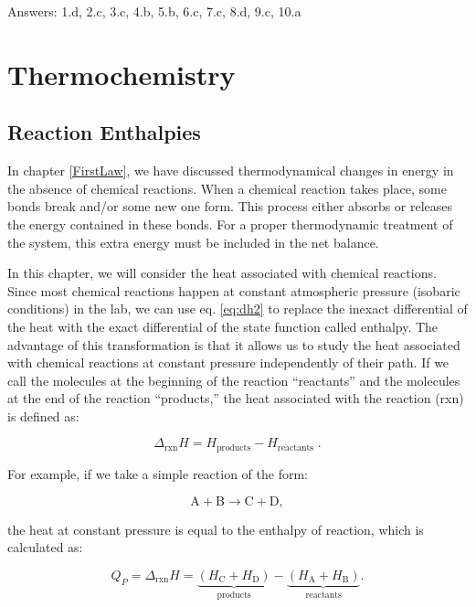 \documentclass[
  9pt,
]{extbook}
\theoremstyle{definition}
\theoremstyle{definition}
\theoremstyle{definition}
\theoremstyle{definition}
\theoremstyle{remark}
\begin{document}
Answers: 1.d, 2.c, 3.c, 4.b, 5.b, 6.c, 7.c, 8.d, 9.c, 10.a

\newcommand*{\standardstate}{{-\kern-6pt{\ominus}\kern-6pt-}}

\chapter{Thermochemistry}\label{Thermochemistry}

\section{Reaction Enthalpies}\label{rxnenthalpy}

In chapter \ref{FirstLaw}, we have discussed thermodynamical changes in energy in the absence of chemical reactions. When a chemical reaction takes place, some bonds break and/or some new one form. This process either absorbs or releases the energy contained in these bonds. For a proper thermodynamic treatment of the system, this extra energy must be included in the net balance.

In this chapter, we will consider the heat associated with chemical reactions. Since most chemical reactions happen at constant atmospheric pressure (isobaric conditions) in the lab, we can use eq. \eqref{eq:dh2} to replace the inexact differential of the heat with the exact differential of the state function called enthalpy. The advantage of this transformation is that it allows us to study the heat associated with chemical reactions at constant pressure independently of their path. If we call the molecules at the beginning of the reaction ``reactants'' and the molecules at the end of the reaction ``products,'' the heat associated with the reaction (rxn) is defined as:

\begin{equation}
  \Delta_{\text{rxn}} H = H_{\text{products}}-H_{\text{reactants}} \; .
  \label{eq:DHrxn1}
\end{equation}

For example, if we take a simple reaction of the form:

\[ \mathrm{A} + \mathrm{B} \rightarrow \mathrm{C} + \mathrm{D}, \]

the heat at constant pressure is equal to the enthalpy of reaction, which is calculated as:

\begin{equation}
  Q_P = \Delta_{\text{rxn}} H = \underbrace{ \left (H_{\mathrm{C}}+H_{\mathrm{D}} \right) }_{\text{products}} - \underbrace{\left( H_{\mathrm{A}}+H_{\mathrm{B}}\right)}_{\text{reactants}}.
  \label{eq:DHrxn2}
\end{equation}
\end{document}
